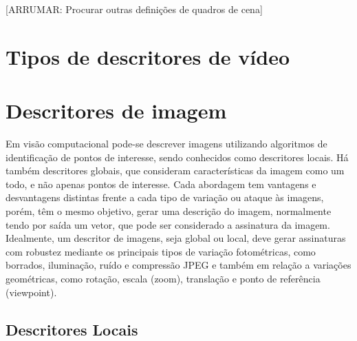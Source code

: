        [ARRUMAR: Procurar outras definições de quadros de cena]
        
        \section{Tipos de descritores de vídeo}
        \label{sec:tiposdescritores}
        

\section{Descritores de imagem}
\label{descritores de imagem}

Em visão computacional pode-se descrever imagens utilizando algoritmos de identificação de pontos de interesse, sendo conhecidos como descritores locais. Há também descritores globais, que consideram características da imagem como um todo, e não apenas pontos de interesse. Cada abordagem tem vantagens e desvantagens distintas frente a cada tipo de variação ou ataque às imagens, porém, têm o mesmo objetivo, gerar uma descrição do imagem, normalmente tendo por saída um vetor, que pode ser considerado a assinatura da imagem. Idealmente, um descritor de imagens, seja global ou local, deve gerar assinaturas com robustez mediante os principais tipos de variação fotométricas, como borrados, iluminação, ruído e compressão JPEG e também em relação a variações geométricas, como rotação, escala (zoom), translação e ponto de referência (viewpoint).

\subsection{Descritores Locais}
\label{descritores locais}

